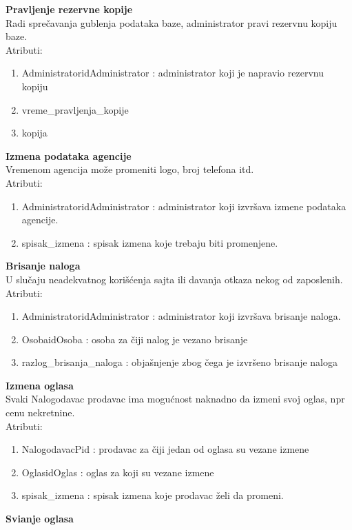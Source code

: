 \documentclass[20pt]{article}
\begin{document}
{\bfseries Pravljenje rezervne kopije}\\
Radi spre\v {c}avanja gublenja podataka baze, administrator pravi rezervnu kopiju baze.\\
\indent Atributi:
\begin{enumerate}
        \item  AdministratoridAdministrator : administrator koji je napravio rezervnu kopiju 
        \item  vreme\_pravljenja\_kopije
        \item  kopija
\end{enumerate}
\newpage
{\bfseries Izmena podataka agencije}\\
Vremenom agencija mo\v {z}e promeniti logo, broj telefona itd.\\
\indent Atributi:
\begin{enumerate}
        \item  AdministratoridAdministrator : administrator koji izvr\v {s}ava izmene podataka agencije.
        \item  spisak\_izmena : spisak izmena koje trebaju biti promenjene.
\end{enumerate}
{\bfseries Brisanje naloga}\\
U slu\v {c}aju neadekvatnog kori\v {s}\' cenja sajta ili davanja otkaza nekog od zaposlenih.
\indent Atributi:
\begin{enumerate}
        \item  AdministratoridAdministrator : administrator koji izvr\v {s}ava brisanje naloga.
        \item  OsobaidOsoba : osoba za \v {c}iji nalog je vezano brisanje
        \item  razlog\_brisanja\_naloga : obja\v {s}njenje zbog \v {c}ega je izvr\v {s}eno brisanje naloga
\end{enumerate}
{\bfseries Izmena oglasa}\\
Svaki Nalogodavac prodavac ima mogu\' cnost naknadno da izmeni svoj oglas, npr cenu nekretnine.\\
\indent Atributi:
\begin{enumerate}
        \item  NalogodavacPid : prodavac za \v {c}iji jedan od oglasa su vezane izmene
        \item OglasidOglas : oglas za koji su vezane izmene
        \item  spisak\_izmena : spisak izmena koje prodavac \v {z}eli da promeni.
\end{enumerate}
{\bfseries Svi\dj anje oglasa}\\
\end{document}

